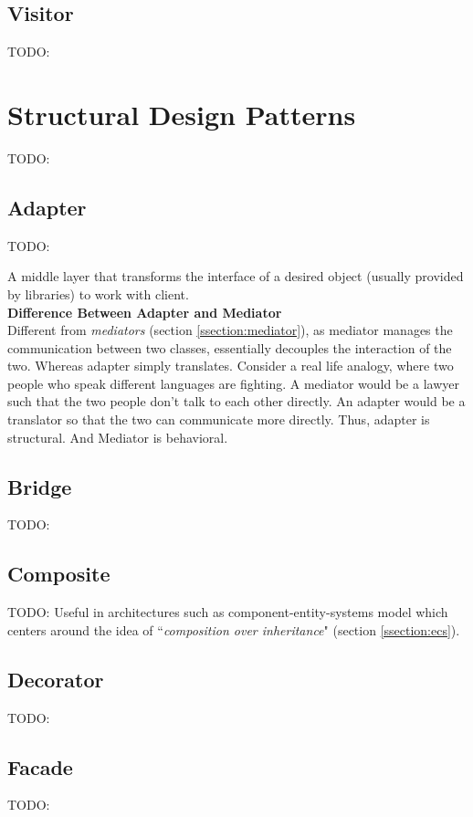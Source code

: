 \documentclass[10pt,letterpaper]{article}
\newcommand{\bs}{\bigskip}
\begin{document}
\begin{multicols}{2}
\subsection{Visitor}
TODO:

\section{Structural Design Patterns}
TODO:

\subsection{Adapter}
TODO:

A middle layer that transforms the interface of a desired object (usually provided by libraries) to work with client.\bs
\\


\textbf{Difference Between Adapter and Mediator}\bs
\\

Different from \textit{mediators} (section \ref{ssection:mediator}), as mediator manages the communication between two classes, essentially decouples the interaction of the two. Whereas adapter simply translates.
\bs
Consider a real life analogy, where two people who speak different languages are fighting. A mediator would be a lawyer such that the two people don't talk to each other directly. An adapter would be a translator so that the two can communicate more directly. Thus, adapter is structural. And Mediator is behavioral.

\subsection{Bridge}
TODO:

\subsection{Composite}
TODO:
Useful in architectures such as component-entity-systems model which centers around the idea of ``\textit{composition over inheritance}" (section \ref{ssection:ecs}).


\subsection{Decorator}
TODO:

\subsection{Facade}
TODO:


\end{multicols}
\end{document}
